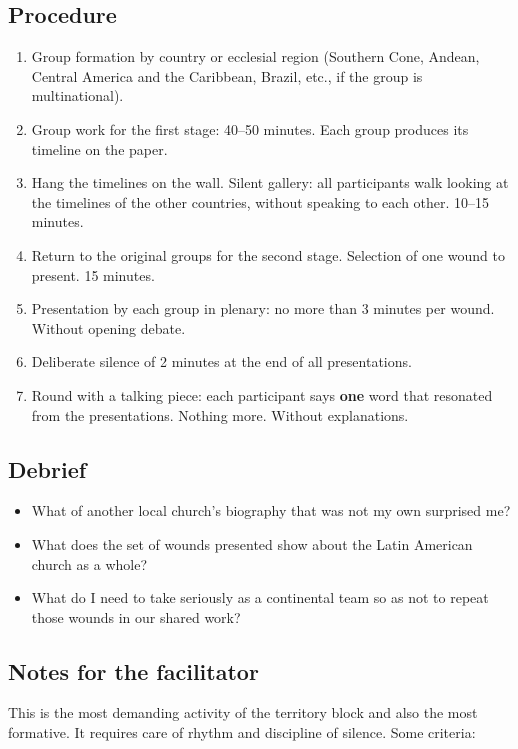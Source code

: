 \documentclass[11pt, a4paper]{article}
\begin{document}
\begin{actividad}
\subsection*{Procedure}
\begin{enumerate}[label={\arabic*.}]
  \item Group formation by country or ecclesial region (Southern Cone, Andean, Central America and the Caribbean, Brazil, etc., if the group is multinational).
  \item Group work for the first stage: 40--50 minutes. Each group produces its timeline on the paper.
  \item Hang the timelines on the wall. Silent gallery: all participants walk looking at the timelines of the other countries, without speaking to each other. 10--15 minutes.
  \item Return to the original groups for the second stage. Selection of one wound to present. 15 minutes.
  \item Presentation by each group in plenary: no more than 3 minutes per wound. Without opening debate.
  \item Deliberate silence of 2 minutes at the end of all presentations.
  \item Round with a talking piece: each participant says \textbf{one} word that resonated from the presentations. Nothing more. Without explanations.
\end{enumerate}

\subsection*{Debrief}
\begin{itemize}
  \item What of another local church's biography that was not my own surprised me?
  \item What does the set of wounds presented show about the Latin American church as a whole?
  \item What do I need to take seriously as a continental team so as not to repeat those wounds in our shared work?
\end{itemize}

\subsection*{Notes for the facilitator}
This is the most demanding activity of the territory block and also the most formative. It requires care of rhythm and discipline of silence. Some criteria:


\end{actividad}
\end{document}
